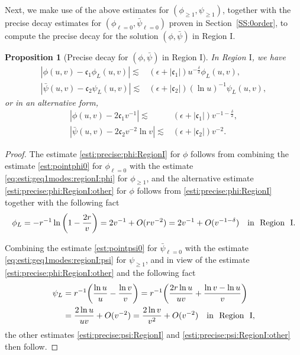 \documentclass[a4paper,reqno]{amsart}
\newtheorem{proposition}[theorem]{Proposition}
\theoremstyle{definition}
\numberwithin{equation}{section}
\def\ep{\epsilon}
\def\de{\delta}
\def\lab{\label}
\begin{document}
Next, we make use of the above estimates for $(\phi_{\geq 1}, \psi_{\geq 1})$, together with the precise decay estimates for $(\phi_{\ell=0}, \bar{\psi}_{\ell=0})$ proven in Section~\ref{SS:0order}, to compute the precise decay for the solution $(\phi,\bar\psi)$ in Region $\textrm{I}$.

\begin{proposition}[Precise decay for $(\phi,\bar\psi)$ in Region $\textrm{I}$]
\lab{prop:precise:phi:RegionI}
In Region $\mathrm{I}$, we have
\begin{subequations}
\lab{esti:precise:phipsi:RegionI}
\begin{align}\label{esti:precise:phi:RegionI}
\left|\phi(u,v)-\mathfrak{c}_{1}\phi_{L}(u,v)\right|\lesssim& (\ep+|\mathfrak{c}_1|)u^{-\frac{\delta}{2}}\phi_{L}(u,v),\\
\label{esti:precise:psi:RegionI}
\left|\bar\psi(u,v)-\mathfrak{c}_{2}\psi_{L}(u,v)\right|\lesssim& (\ep+|\mathfrak{c}_2|)(\ln u)^{-1}\psi_{L}(u,v),
\end{align}
\end{subequations}
or in an alternative form,
\begin{subequations}
\lab{esti:precise:phipsi:RegionI:other}
\begin{align}\label{esti:precise:phi:RegionI:other}
\left|\phi(u,v)-2\mathfrak{c}_1v^{-1}\right|\lesssim& (\ep+|\mathfrak{c}_1|)v^{-1-\frac{\delta}{2}},\\
\label{esti:precise:psi:RegionI:other}
\left|\bar\psi(u,v)-2\mathfrak{c}_{2}v^{-2}\ln v\right|\lesssim& (\ep+|\mathfrak{c}_2|)v^{-2}.
\end{align}
\end{subequations}
\end{proposition}

\begin{proof}
The estimate \eqref{esti:precise:phi:RegionI} for $\phi$ follows from combining the estimate \eqref{est:pointphi0} for $\phi_{\ell=0}$ with the estimate \eqref{eq:esti:geq1modes:regionI:phi} for $\phi_{\geq 1}$, and the alternative estimate \eqref{esti:precise:phi:RegionI:other} for $\phi$ follows from \eqref{esti:precise:phi:RegionI} together with the following fact
\begin{equation*}
\phi_{L}=-r^{-1}\ln \bigg(1-\frac{2r}{v}\bigg)= 2v^{-1} + O(rv^{-2}) = 2v^{-1} + O(v^{-1-\de}) \quad \textrm{in\,\, Region\,\, I}.
\end{equation*}

  Combining the estimate \eqref{est:pointpsi0} for $\bar{\psi}_{\ell=0}$ with the estimate \eqref{eq:esti:geq1modes:regionI:psi} for $\psi_{\geq 1}$, and in view of the estimate \eqref{esti:precise:phi:RegionI:other} and the following fact
\begin{align*}
\psi_{L}={}&r^{-1} \bigg(\frac{\ln u}{u} - \frac{\ln v}{v}\bigg)=r^{-1}\bigg(\frac{2r\ln u }{u v} + \frac{\ln v - \ln u }{v}
\bigg)
\\
={}&\frac{2\ln u }{uv} +O(v^{-2})=\frac{2\ln v}{v^2} + O(v^{-2}) \quad \textrm{in\,\, Region\,\, I},
\end{align*}
the other estimates \eqref{esti:precise:psi:RegionI} and  \eqref{esti:precise:psi:RegionI:other} then follow.
\end{proof}
\end{document}
